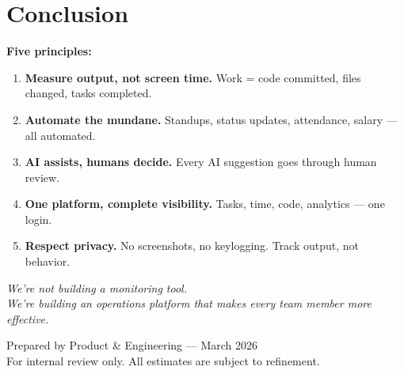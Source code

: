 \documentclass[12pt,a4paper]{article}
\begin{document}
\section{Conclusion}

\textbf{Five principles:}

\begin{enumerate}
    \item \textbf{Measure output, not screen time.} Work = code committed, files changed, tasks completed.
    \item \textbf{Automate the mundane.} Standups, status updates, attendance, salary --- all automated.
    \item \textbf{AI assists, humans decide.} Every AI suggestion goes through human review.
    \item \textbf{One platform, complete visibility.} Tasks, time, code, analytics --- one login.
    \item \textbf{Respect privacy.} No screenshots, no keylogging. Track output, not behavior.
\end{enumerate}

\vspace{1cm}
\begin{center}
\textit{We're not building a monitoring tool.\\We're building an operations platform that makes every team member more effective.}
\end{center}

\vfill
\begin{center}
\small\color{muted}
Prepared by Product \& Engineering --- March 2026\\
For internal review only. All estimates are subject to refinement.
\end{center}
\end{document}
